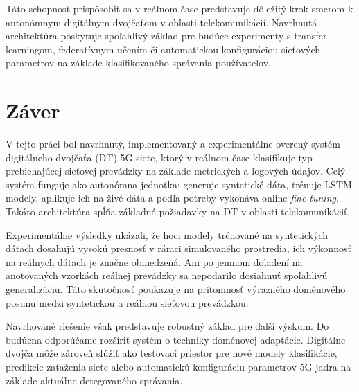 \documentclass[a4paper,conference]{IEEEtran}
\begin{document}
Táto schopnosť prispôsobiť sa v reálnom čase predstavuje dôležitý krok smerom k autonómnym digitálnym dvojčaťom v oblasti telekomunikácií. Navrhnutá architektúra poskytuje spoľahlivý základ pre budúce experimenty s transfer learningom, federatívnym učením či automatickou konfiguráciou sieťových parametrov na základe klasifikovaného správania používateľov.

\section{Záver}
\label{sec_conclusion}

V tejto práci bol navrhnutý, implementovaný a experimentálne overený systém digitálneho dvojčaťa (DT) 5G siete, ktorý v reálnom čase klasifikuje typ prebiehajúcej sieťovej prevádzky na základe metrických a logových údajov. Celý systém funguje ako autonómna jednotka: generuje syntetické dáta, trénuje LSTM modely, aplikuje ich na živé dáta a podľa potreby vykonáva online \textit{fine-tuning}. Takáto architektúra spĺňa základné požiadavky na DT v oblasti telekomunikácií.

Experimentálne výsledky ukázali, že hoci modely trénované na syntetických dátach dosahujú vysokú presnosť v rámci simulovaného prostredia, ich výkonnosť na reálnych dátach je značne obmedzená. Ani po jemnom doladení na anotovaných vzorkách reálnej prevádzky sa nepodarilo dosiahnuť spoľahlivú generalizáciu. Táto skutočnosť poukazuje na prítomnosť výrazného doménového posunu medzi syntetickou a reálnou sieťovou prevádzkou.

Navrhované riešenie však predstavuje robustný základ pre ďalší výskum. Do budúcna odporúčame rozšíriť systém o techniky doménovej adaptácie. Digitálne dvojča môže zároveň slúžiť ako testovací priestor pre nové modely klasifikácie, predikcie zaťaženia siete alebo automatickú konfiguráciu parametrov 5G jadra na základe aktuálne detegovaného správania.


%
\end{document}

